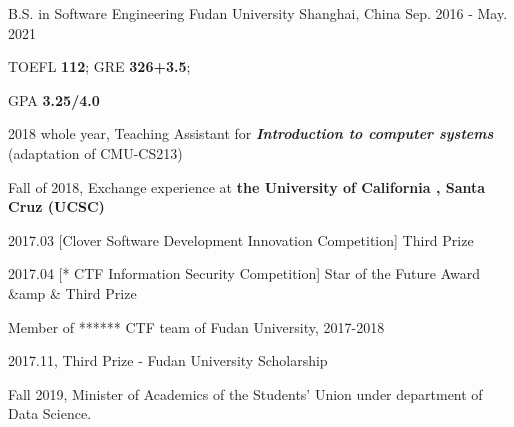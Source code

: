 

\begin{cventries}

  \cventry
    {B.S. in Software Engineering} %
    {Fudan University} %
    {Shanghai, China} %
    {Sep. 2016 - May. 2021} %
    {
      \begin{cvitems} %
      \end{cvitems}

      \begin{cvitems} %
        \item {TOEFL \textbf{112}; GRE \textbf{326+3.5};}
        \item {GPA \textbf{3.25/4.0}}
        \item {2018 whole year,  Teaching Assistant for \textbf{\textit{Introduction to computer systems}} (adaptation of CMU-CS213)}
        \item {Fall of 2018, Exchange experience at \textbf{the University of California ,  Santa Cruz (UCSC)} }
        \item {2017.03 [Clover Software Development Innovation Competition] Third Prize}
        \item {2017.04 [* CTF Information Security Competition] Star of the Future Award &amp \& Third Prize}
        \item {Member of ****** CTF team of Fudan University, 2017-2018}
        \item {2017.11, Third Prize - Fudan University Scholarship}
        \item {Fall 2019, Minister of Academics of the Students' Union under department of Data Science.}
      \end{cvitems}

    }

\end{cventries}
